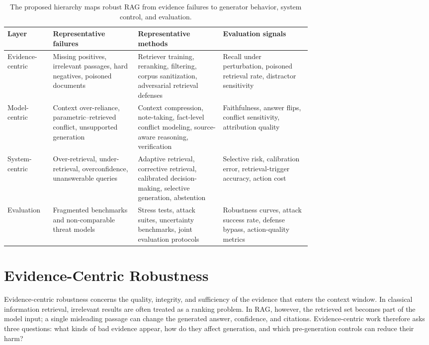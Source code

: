 \documentclass[11pt]{article}
\begin{document}
\begin{table}[t]
\centering
\small
\begin{tabularx}{\linewidth}{p{0.15\linewidth}p{0.28\linewidth}p{0.28\linewidth}X}
\toprule
\textbf{Layer} & \textbf{Representative failures} & \textbf{Representative methods} & \textbf{Evaluation signals} \\
\midrule
Evidence-centric & Missing positives, irrelevant passages, hard negatives, poisoned documents & Retriever training, reranking, filtering, corpus sanitization, adversarial retrieval defenses & Recall under perturbation, poisoned retrieval rate, distractor sensitivity \\
Model-centric & Context over-reliance, parametric--retrieved conflict, unsupported generation & Context compression, note-taking, fact-level conflict modeling, source-aware reasoning, verification & Faithfulness, answer flips, conflict sensitivity, attribution quality \\
System-centric & Over-retrieval, under-retrieval, overconfidence, unanswerable queries & Adaptive retrieval, corrective retrieval, calibrated decision-making, selective generation, abstention & Selective risk, calibration error, retrieval-trigger accuracy, action cost \\
Evaluation & Fragmented benchmarks and non-comparable threat models & Stress tests, attack suites, uncertainty benchmarks, joint evaluation protocols & Robustness curves, attack success rate, defense bypass, action-quality metrics \\
\bottomrule
\end{tabularx}
\caption{The proposed hierarchy maps robust RAG from evidence failures to generator behavior, system control, and evaluation.}
\label{tab:hierarchy}
\end{table}

\section{Evidence-Centric Robustness}
\label{sec:evidence}

Evidence-centric robustness concerns the quality, integrity, and sufficiency of the evidence that enters the context window. In classical information retrieval, irrelevant results are often treated as a ranking problem. In RAG, however, the retrieved set becomes part of the model input; a single misleading passage can change the generated answer, confidence, and citations. Evidence-centric work therefore asks three questions: what kinds of bad evidence appear, how do they affect generation, and which pre-generation controls can reduce their harm?
\end{document}
